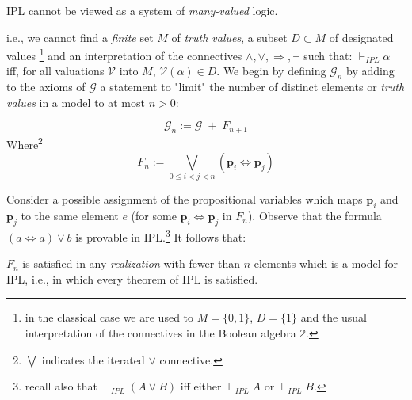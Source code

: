 		 \begin{thm}
		 	IPL cannot be viewed as a system of \emph{many-valued} logic.
		 	 \end{thm}
		 	i.e., we cannot find a \emph{finite} set $M$ of \emph{truth values}, a subset $D \subset M$ of designated values \footnote{in the classical case we are used to $M= \{0,1\} $, $D= \{1\}$ and the usual interpretation of the connectives in the Boolean algebra $\mathbb{2}$. } and an interpretation of the connectives $\land,\lor,\Rightarrow,\neg$ such that:
		 	$\vdash_{IPL} \alpha$ iff, for all valuations $\mathcal{V}$ into $M$, $\mathcal{V}(\alpha) \in D$. 
		\newline
		 \newline
			 We begin by defining $\mathcal{G}_n$ by adding to the axioms of $\mathcal{G}$ a statement to "limit" the number of distinct elements or \emph{truth values} in a model to at most $n > 0$:
			 \begin{definition}
			 	\[ \mathcal{G}_n := \mathcal{G} \; + \; {F_{n+1}} \]
			 	Where\footnote{$\bigvee$ indicates the iterated $\lor$ connective.}  \[ F_n := \bigvee_{0 \leq i < j < n} (\textbf{p}_i \Leftrightarrow \textbf{p}_j) \]
			 \end{definition}
			 
			 Consider a possible assignment of the propositional variables which maps $\textbf{p}_i$ and $\textbf{p}_j$ to the same element $e$ (for some $\textbf{p}_i \Leftrightarrow \textbf{p}_j$ in $F_n$).\newline
			 Observe that the formula $(a \Leftrightarrow a) \lor b$ is provable in IPL.\footnote{recall also that $\vdash_{IPL} (A \lor B)$ iff either $\vdash_{IPL} A$ or $\vdash_{IPL} B$.}
		\newline
			 It follows that:
			 
			 \begin{lem}
			 	 $F_n$ is satisfied in any \emph{realization} with fewer than $n$ elements which is a model for IPL, i.e., in which every theorem of IPL is satisfied.  
			 \end{lem}
			 
